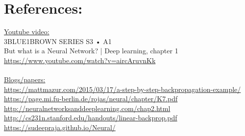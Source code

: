 \documentclass{article}
\begin{document}
\section*{References:}
\underline{Youtube video:}
\\
3BLUE1BROWN SERIES  S3 • A1
\\
But what is a Neural Network? | Deep learning, chapter 1 \url{https://www.youtube.com/watch?v=aircAruvnKk}
\\
\\
\underline{Blogs/papers:}
\\
\url{https://mattmazur.com/2015/03/17/a-step-by-step-backpropagation-example/}
\\
\url{https://page.mi.fu-berlin.de/rojas/neural/chapter/K7.pdf}
\\
\url{http://neuralnetworksanddeeplearning.com/chap2.html}
\\
\url{http://cs231n.stanford.edu/handouts/linear-backprop.pdf}
\\
\url{https://sudeepraja.github.io/Neural/}
\\
\\
\\
\\
\\
\\
\end{document}
